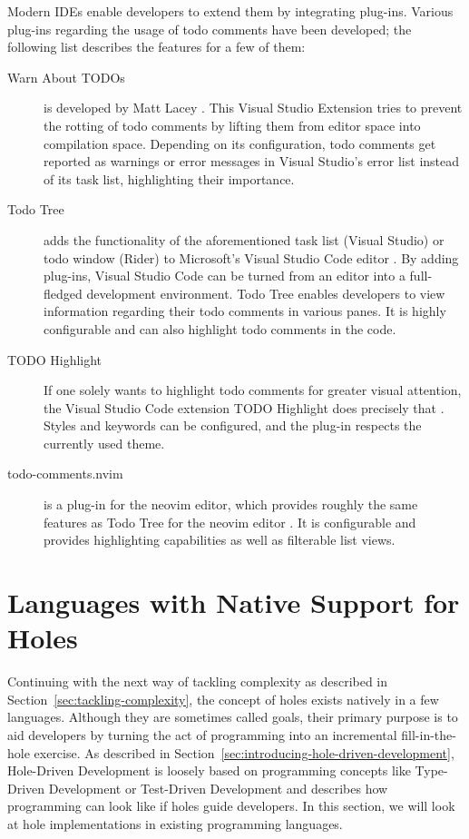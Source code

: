 Modern IDEs enable developers to extend them by integrating plug-ins.
Various plug-ins regarding the usage of todo comments have been developed; the following list describes the features for a few of them:
\begin{description}
  \item[Warn About TODOs] is developed by Matt Lacey \cite{lacey_warn_2023}. This Visual Studio Extension tries to prevent the rotting of todo comments by lifting them from editor space into compilation space. Depending on its configuration, todo comments get reported as warnings or error messages in Visual Studio's error list instead of its task list, highlighting their importance.
  \item[Todo Tree] adds the functionality of the aforementioned task list (Visual Studio) or todo window (Rider) to Microsoft's Visual Studio Code editor \cite{scott_todo_2023}. By adding plug-ins, Visual Studio Code can be turned from an editor into a full-fledged development environment. Todo Tree enables developers to view information regarding their todo comments in various panes. It is highly configurable and can also highlight todo comments in the code.
  \item[TODO Highlight] If one solely wants to highlight todo comments for greater visual attention, the Visual Studio Code extension TODO Highlight does precisely that \cite{wayou_vscode_2023}. Styles and keywords can be configured, and the plug-in respects the currently used theme.
  \item[todo-comments.nvim] is a plug-in for the neovim editor, which provides roughly the same features as Todo Tree for the neovim editor \cite{lemaitre_todo_2023}. It is configurable and provides highlighting capabilities as well as filterable list views.
\end{description}


\section{Languages with Native Support for Holes}
\label{sec:languages-with-native-holes-support}
Continuing with the next way of tackling complexity as described in Section~\ref{sec:tackling-complexity}, the concept of holes exists natively in a few languages.
Although they are sometimes called goals, their primary purpose is to aid developers by turning the act of programming into an incremental fill-in-the-hole exercise.
As described in Section~\ref{sec:introducing-hole-driven-development}, Hole-Driven Development is loosely based on programming concepts like Type-Driven Development \cite{brady_type-driven_2017} or Test-Driven Development \cite{mccracken_digital_1957} and describes how programming can look like if holes guide developers.
In this section, we will look at hole implementations in existing programming languages.

